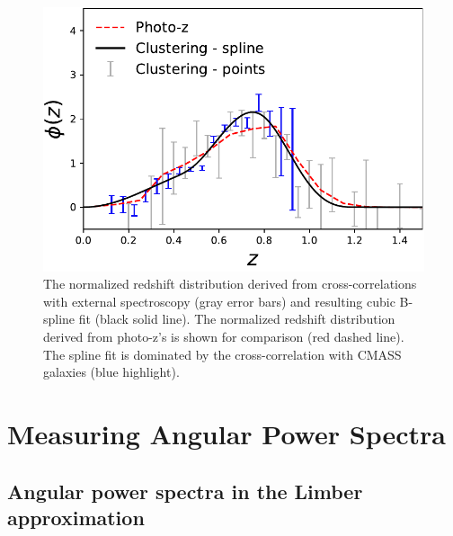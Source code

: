 \documentclass[a4paper,usenatbib]{mnras}
\begin{document}
\begin{figure}
\includegraphics[width=\linewidth]{figures/clustering_dndz.pdf}
\caption{The normalized redshift distribution derived from cross-correlations with external spectroscopy (gray error bars) and resulting cubic B-spline fit (black solid line). The normalized redshift distribution derived from photo-z's is shown for comparison (red dashed line). The spline fit is dominated by the cross-correlation with CMASS galaxies (blue highlight).}
\label{fig:clustering_dndz}
\end{figure}

\section{Measuring Angular Power Spectra}\label{sec:master_pipe}
%

\subsection{Angular power spectra in the Limber approximation}
%
%
%
%
%
\end{document}
